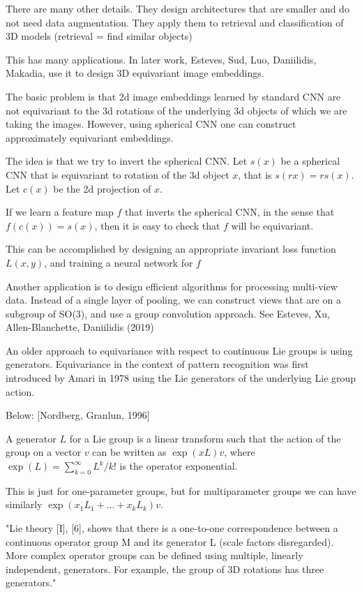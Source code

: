 \documentclass[english]{article}
\begin{document}
There are many other details. They design architectures that are smaller and do not need data augmentation. They apply them to retrieval and classification of 3D models (retrieval = find similar objects)

\item This has many applications. In later work, Esteves, Sud, Luo, Daniilidis, Makadia, use it to design 3D equivariant image embeddings. 

The basic problem is that 2d image embeddings learned by standard CNN are not equivariant to the 3d rotations of the underlying 3d objects of which we are taking the images. However, using spherical CNN one can construct approximately equivariant embeddings. 

The idea is that we try to invert the spherical CNN. Let $s(x)$ be a spherical CNN that is equivariant to rotation of the 3d object $x$, that is $s(rx)=rs(x)$. Let $c(x)$ be the 2d projection of $x$. 

If we learn a feature map $f$ that inverts the spherical CNN, in the sense that $f(c(x))=s(x)$, then it is easy to check that $f$ will be equivariant. 

This can be accomplished by designing an appropriate invariant loss function $L(x,y)$, and training a neural network for $f$

\item Another application is to design efficient algorithms for processing multi-view data. Instead of a single layer of pooling, we can construct views that are on a subgroup of SO(3), and use a group convolution approach. See Esteves, Xu, Allen-Blanchette, Daniilidis (2019)

\item An older approach to equivariance with respect to continuous Lie groups is using generators. Equivariance in the context of pattern recognition was first introduced by Amari in 1978 using the Lie generators
of the underlying Lie group action.


Below: [Nordberg, Granlun, 1996]

A generator $L$ for a Lie group is a linear transform such that the action of the group on a vector $v$ can be written as $\exp(xL)v$, where $\exp(L) = \sum_{k=0}^\infty L^k/k!$ is the operator exponential. 

This is just for one-parameter groups, but for multiparameter groups we can have similarly $\exp(x_1L_1+\ldots+x_k L_k)v$.

"Lie theory [I], [6], shows that there is a one-to-one correspondence between a continuous operator group M
and its generator L (scale factors disregarded). More
complex operator groups can be defined using multiple, linearly independent, generators. For example, the
group of 3D rotations has three generators."
\end{document}

